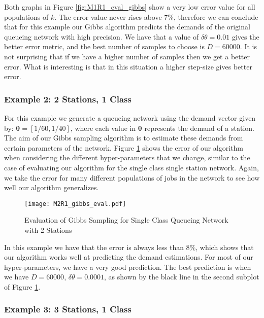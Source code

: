 \documentclass[a4paper,11pt,titlepage]{article}
\begin{document}
Both graphs in Figure \ref{fig:M1R1_eval_gibbs} show a very low error value for all populations of $k$. The error value never rises above $7\%$, therefore we can conclude that for this example our Gibbs algorithm predicts the demands of the original queueing network with high precision. We have that a value of $\delta \theta = 0.01$ gives the better error metric, and the best number of samples to choose is $D = 60000$. It is not surprising that if we have a higher number of samples then we get a better error. What is interesting is that in this situation a higher step-size gives better error.

\subsubsection{Example 2: 2 Stations, 1 Class}

For this example we generate a queueing network using the demand vector given by: $\bm{\theta} = [1/60,1/40]$, where each value in $\bm{\theta}$ represents the demand of a station. The aim of our Gibbs sampling algorithm is to estimate these demands from certain parameters of the network. Figure \ref{fig:M2R1_eval_gibbs} shows the error of our algorithm when considering the different hyper-parameters that we change, similar to the case of evaluating our algorithm for the single class single station network. Again, we take the error for many different populations of jobs in the network to see how well our algorithm generalizes. \\

\begin{figure}[h!]
\begin{center}
\texttt{[image: M2R1\_gibbs\_eval.pdf]}
\caption{Evaluation of Gibbs Sampling for Single Class Queueing Network with 2 Stations}
\label{fig:M2R1_eval_gibbs}
\end{center}
\end{figure}

In this example we have that the error is always less than $8\%$, which shows that our algorithm works well at predicting the demand estimations. For most of our hyper-parameters, we have a very good prediction. The best prediction is when we have $D = 60000$, $\delta \theta = 0.0001$, as shown by the black line in the second subplot of Figure \ref{fig:M2R1_eval_gibbs}. 

\subsubsection{Example 3: 3 Stations, 1 Class}
\end{document}
